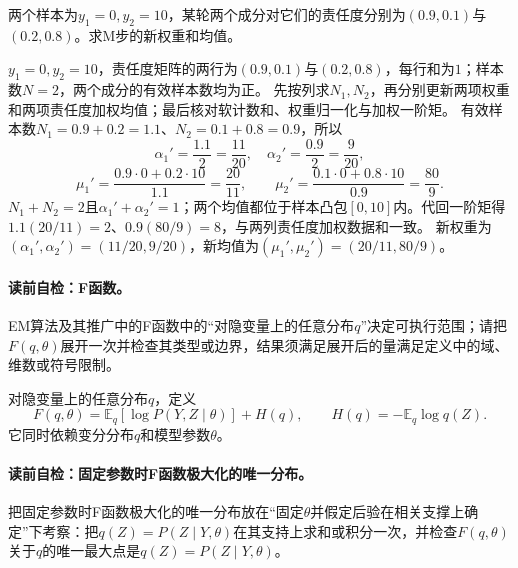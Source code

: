 \label{struct:V3-C04-CH18}
\begin{example}[责任度加权的高斯混合M步]\label{exm:V3-C04-three-coins-em}
两个样本为$y_1=0,y_2=10$，某轮两个成分对它们的责任度分别为$(0.9,0.1)$与$(0.2,0.8)$。求M步的新权重和均值。
\end{example}
\begin{solution}
\SolGiven $y_1=0,y_2=10$，责任度矩阵的两行为$(0.9,0.1)$与$(0.2,0.8)$，每行和为$1$；样本数$N=2$，两个成分的有效样本数均为正。
\SolPlan 先按列求$N_1,N_2$，再分别更新两项权重和两项责任度加权均值；最后核对软计数和、权重归一化与加权一阶矩。
\SolDerive
有效样本数$N_1=0.9+0.2=1.1$、$N_2=0.1+0.8=0.9$，所以
\[
\alpha_1'=\frac{1.1}{2}=\frac{11}{20},\quad
\alpha_2'=\frac{0.9}{2}=\frac9{20},
\]
\[
\mu_1'=\frac{0.9\cdot0+0.2\cdot10}{1.1}=\frac{20}{11},\qquad
\mu_2'=\frac{0.1\cdot0+0.8\cdot10}{0.9}=\frac{80}{9}.
\]
\SolCheck $N_1+N_2=2$且$\alpha_1'+\alpha_2'=1$；两个均值都位于样本凸包$[0,10]$内。代回一阶矩得$1.1(20/11)=2$、$0.9(80/9)=8$，与两列责任度加权数据和一致。
\SolAnswer 新权重为$(\alpha_1',\alpha_2')=(11/20,9/20)$，新均值为$(\mu_1',\mu_2')=(20/11,80/9)$。
\end{solution}


\paragraph{读前自检：F函数。}EM算法及其推广中的F函数中的“对隐变量上的任意分布$q$”决定可执行范围；请把$F(q,\theta)$展开一次并检查其类型或边界，结果须满足展开后的量满足定义中的域、维数或符号限制。\par

\begin{definition}[$F$函数]\label{def:V3-C04-F}
对隐变量上的任意分布$q$，定义
\[
F(q,\theta)=\mathbb E_q[\log P(Y,Z\mid\theta)]+H(q),
\qquad H(q)=-\mathbb E_q\log q(Z).
\]
它同时依赖变分分布$q$和模型参数$\theta$。
\end{definition}

\paragraph{读前自检：固定参数时F函数极大化的唯一分布。}把固定参数时F函数极大化的唯一分布放在“固定$\theta$并假定后验在相关支撑上确定”下考察：把$q(Z)=P(Z\mid Y,\theta)$在其支持上求和或积分一次，并检查$F(q,\theta)$关于$q$的唯一最大点是$q(Z)=P(Z\mid Y,\theta)$。\par

